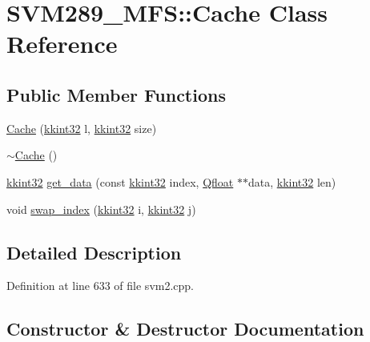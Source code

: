 \hypertarget{class_s_v_m289___m_f_s_1_1_cache}{}\section{S\+V\+M289\+\_\+\+M\+FS\+:\+:Cache Class Reference}
\label{class_s_v_m289___m_f_s_1_1_cache}
\subsection*{Public Member Functions}
\begin{DoxyCompactItemize}
\item 
\hyperlink{class_s_v_m289___m_f_s_1_1_cache_a6b9536a21eebe0ad7ef902d91ba64a60}{Cache} (\hyperlink{namespace_k_k_b_a8fa4952cc84fda1de4bec1fbdd8d5b1b}{kkint32} l, \hyperlink{namespace_k_k_b_a8fa4952cc84fda1de4bec1fbdd8d5b1b}{kkint32} size)
\item 
\hyperlink{class_s_v_m289___m_f_s_1_1_cache_a4af4dec60bcb1e0166f85ff00b06bdf2}{$\sim$\+Cache} ()
\item 
\hyperlink{namespace_k_k_b_a8fa4952cc84fda1de4bec1fbdd8d5b1b}{kkint32} \hyperlink{class_s_v_m289___m_f_s_1_1_cache_a95c3d5d6c3dcbeccc839e075a18632c8}{get\+\_\+data} (const \hyperlink{namespace_k_k_b_a8fa4952cc84fda1de4bec1fbdd8d5b1b}{kkint32} index, \hyperlink{namespace_s_v_m289___m_f_s_a440663a1b8d42bc10329401883645ae1}{Qfloat} $\ast$$\ast$data, \hyperlink{namespace_k_k_b_a8fa4952cc84fda1de4bec1fbdd8d5b1b}{kkint32} len)
\item 
void \hyperlink{class_s_v_m289___m_f_s_1_1_cache_acd8f8f78ff0ca175f2fba2da2998b2ba}{swap\+\_\+index} (\hyperlink{namespace_k_k_b_a8fa4952cc84fda1de4bec1fbdd8d5b1b}{kkint32} i, \hyperlink{namespace_k_k_b_a8fa4952cc84fda1de4bec1fbdd8d5b1b}{kkint32} j)
\end{DoxyCompactItemize}


\subsection{Detailed Description}


Definition at line 633 of file svm2.\+cpp.



\subsection{Constructor \& Destructor Documentation}
